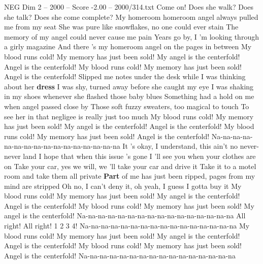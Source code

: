 \begin{textsample}{NEG Dim 2 – 2000 – Score -2.00 – 2000/314.txt}  \label{ex:f2_neg_036}
Come on!
Does she walk?
Does she talk?
Does she come complete?
My homeroom homeroom angel always pulled me from my seat She was pure like snowflakes, no one could ever stain The memory of my angel could never cause me pain Years go by, I 'm looking through a girly magazine And there 's my homeroom angel on the pages in between My blood runs cold!
My memory has just been sold!
My angel is the centerfold!
Angel is the centerfold!
My blood runs cold!
My memory has just been sold!
Angel is the centerfold!
Slipped me notes under the desk while I was thinking about her \textbf{dress} I was shy, turned away before she caught my eye I was shaking in my shoes whenever she flashed those baby blues Something had a hold on me when angel passed close by Those soft fuzzy sweaters, too magical to touch To see her in that negligee is really just too much My blood runs cold!
My memory has just been sold!
My angel is the centerfold!
Angel is the centerfold!
My blood runs cold!
My memory has just been sold!
Angel is the centerfold!
Na-na-na-na-na-na-na-na-na-na-na-na-na-na-na-na It 's okay, I understand, this ain't no never-never land I hope that when this issue 's gone I 'll see you when your clothes are on Take your car, yes we will, we 'll take your car and drive it Take it to a motel room and take them all private \textbf{Part} of me has just been ripped, pages from my mind are stripped Oh no, I can't deny it, oh yeah, I guess I gotta buy it My blood runs cold!
My memory has just been sold!
My angel is the centerfold!
Angel is the centerfold!
My blood runs cold!
My memory has just been sold!
My angel is the centerfold!
Na-na-na-na-na-na-na-na-na-na-na-na-na-na-na-na All right!
All right! 1 2 3 4!
Na-na-na-na-na-na-na-na-na-na-na-na-na-na-na-na My blood runs cold!
My memory has just been sold!
My angel is the centerfold!
Angel is the centerfold!
My blood runs cold!
My memory has just been sold!
Angel is the centerfold!
Na-na-na-na-na-na-na-na-na-na-na-na-na-na-na-na

\end{textsample}
